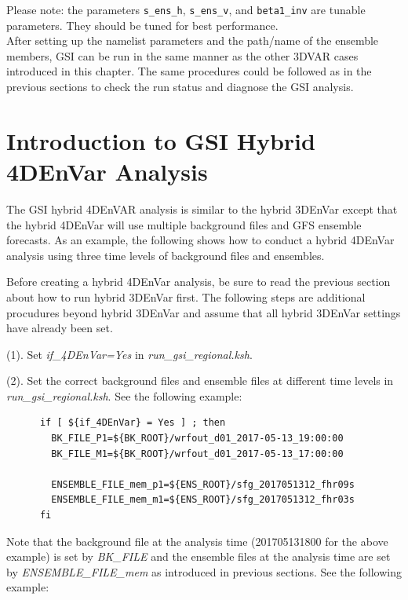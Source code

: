 \begin{itemize}[leftmargin=*]
Please note: the parameters \verb|s_ens_h|, \verb|s_ens_v|, and \verb|beta1_inv| are tunable parameters. They should be tuned for best performance.\\

After setting up the namelist parameters and the path/name of the ensemble members, GSI can be run in the same manner as the other 3DVAR cases introduced in this chapter.  The same procedures could be followed as in the previous sections to check the run status and diagnose the GSI analysis.

\end{itemize}

\newpage
\section{Introduction to GSI Hybrid 4DEnVar Analysis}

The GSI hybrid 4DEnVAR analysis is similar to the hybrid 3DEnVar except that the hybrid 4DEnVar will use multiple background files and GFS ensemble forecasts. As an example, the following shows how to conduct a hybrid 4DEnVar analysis using three time levels of background files and ensembles.

Before creating a hybrid 4DEnVar analysis, be sure to read the previous section about how to run hybrid 3DEnVar first. The following steps are additional procudures beyond hybrid 3DEnVar and assume that all hybrid 3DEnVar settings have already been set. 

(1). Set \textit{if\_4DEnVar=Yes} in \textit{run\_gsi\_regional.ksh}. 

(2). Set the correct background files and ensemble files at different time levels in \textit{run\_gsi\_regional.ksh}. See the following example:
\begin{scriptsize}
\begin{verbatim}
      if [ ${if_4DEnVar} = Yes ] ; then
        BK_FILE_P1=${BK_ROOT}/wrfout_d01_2017-05-13_19:00:00
        BK_FILE_M1=${BK_ROOT}/wrfout_d01_2017-05-13_17:00:00

        ENSEMBLE_FILE_mem_p1=${ENS_ROOT}/sfg_2017051312_fhr09s
        ENSEMBLE_FILE_mem_m1=${ENS_ROOT}/sfg_2017051312_fhr03s
      fi
\end{verbatim}
\end{scriptsize}

  Note that the background file at the analysis time (201705131800 for the above example) is set by \textit{BK\_FILE} and the ensemble files at the analysis time are set by \textit{ENSEMBLE\_FILE\_mem} as introduced in previous sections. See the following example:

